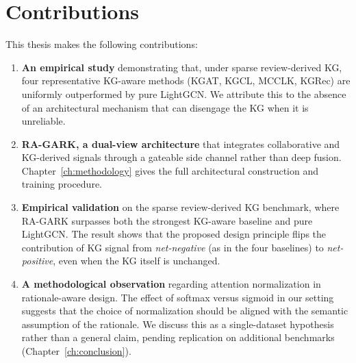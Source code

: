 \section{Contributions}
\label{sec:intro-contributions}

This thesis makes the following contributions:

\begin{enumerate}
  \item \textbf{An empirical study} demonstrating that, under sparse review-derived KG, four representative KG-aware methods (KGAT, KGCL, MCCLK, KGRec) are uniformly outperformed by pure LightGCN. We attribute this to the absence of an architectural mechanism that can disengage the KG when it is unreliable.

  \item \textbf{RA-GARK, a dual-view architecture} that integrates collaborative and KG-derived signals through a gateable side channel rather than deep fusion. Chapter~\ref{ch:methodology} gives the full architectural construction and training procedure.

  \item \textbf{Empirical validation} on the sparse review-derived KG benchmark, where RA-GARK surpasses both the strongest KG-aware baseline and pure LightGCN. The result shows that the proposed design principle flips the contribution of KG signal from \emph{net-negative} (as in the four baselines) to \emph{net-positive}, even when the KG itself is unchanged.

  \item \textbf{A methodological observation} regarding attention normalization in rationale-aware design. The effect of softmax versus sigmoid in our setting suggests that the choice of normalization should be aligned with the semantic assumption of the rationale. We discuss this as a single-dataset hypothesis rather than a general claim, pending replication on additional benchmarks (Chapter~\ref{ch:conclusion}).
\end{enumerate}
